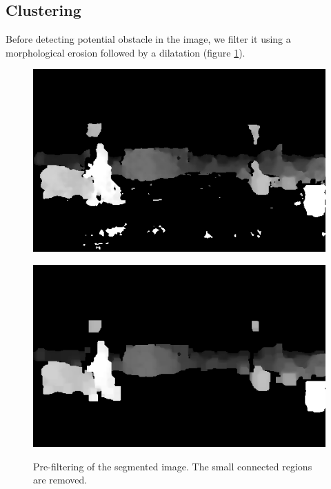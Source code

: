 \documentclass[a4paper,11pt]{article}
\begin{document}
\subsection{Clustering}
Before detecting potential obstacle in the image, we filter it using a morphological erosion followed by a dilatation (figure \ref{morpho-filter}).

\begin{figure}[H]
\centering
\begin{minipage}{0.45\linewidth}
\centering
\includegraphics[scale=0.3]{pic/cartesian-02-25m.png}
\label{morpho-filter:a}
\end{minipage}
\begin{minipage}{0.45\linewidth}
\centering
\includegraphics[scale=0.3]{pic/erode-dilate.png}
\label{morpho-filter:b}
\end{minipage}
\caption{Pre-filtering of the segmented image. The small connected regions are removed.}
\label{morpho-filter}
\end{figure}
\end{document}

